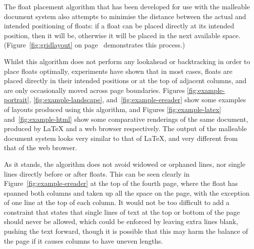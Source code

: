The float placement algorithm that has been developed for use with the malleable document system also attempts to minimise the distance between the actual and intended positioning of floats: if a float can be placed directly at its intended position, then it will be, otherwise it will be placed in the next available space. (Figure~\ref{fig:gridlayout} on page~\pageref{fig:gridlayout} demonstrates this process.)

Whilst this algorithm does not perform any lookahead or backtracking in order to place floats optimally, experiments have shown that in most cases, floats are placed directly in their intended positions or at the top of adjacent columns, and are only occasionally moved across page boundaries. Figures \ref{fig:example-portrait}, \ref{fig:example-landscape}, and~\ref{fig:example-ereader} show some examples of layouts produced using this algorithm, and Figures \ref{fig:example-latex} and~\ref{fig:example-html} show some comparative renderings of the same document, produced by \LaTeX{} and a web browser respectively. The output of the malleable document system looks very similar to that of \LaTeX, and very different from that of the web browser.

As it stands, the algorithm does not avoid widowed or orphaned lines, nor single lines directly before or after floats. This can be seen clearly in Figure~\ref{fig:example-ereader} at the top of the fourth page, where the float has spanned both columns and taken up all the space on the page, with the exception of one line at the top of each column. It would not be too difficult to add a constraint that states that single lines of text at the top or bottom of the page should never be allowed, which could be enforced by leaving extra lines blank, pushing the text forward, though it is possible that this may harm the balance of the page if it causes columns to have uneven lengths.

